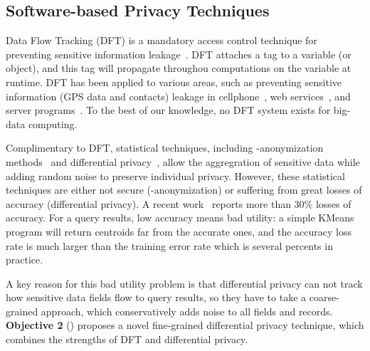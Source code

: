 \vspace{-.15in}\subsection{Software-based Privacy Techniques}
\label{sec:dft}\vspace{-.075in}

Data Flow Tracking (DFT) is a mandatory access control technique for preventing 
sensitive information leakage~\cite{dawn05:taint}. DFT attaches a tag to a 
variable (or object), and this tag will propagate throughou computations on the 
variable at runtime. DFT has been applied to various areas, such as preventing 
sensitive information (\eg GPS data and contacts) leakage in 
cellphone~\cite{taintdroid:osdi10,cleanos:osdi12}, web 
services~\cite{cloudfence:raid13}, and server programs~\cite{libdft:vee12}. To 
the best of our knowledge, no DFT system exists for big-data computing.
 
 


Complimentary to DFT, statistical techniques, including -anonymization 
methods~\cite{kanonymity,icde06:ldiversity} and
differential privacy~\cite{gupt:sigmod12, pinq:sigmod09,airavat:nsdi10}, allow 
the aggregration of sensitive data while adding random noise to preserve 
individual privacy. However, these statistical techniques are either not secure 
(-anonymization) or suffering from great losses of accuracy 
(differential privacy). A recent work~\cite{differentialresult:vldb15} reports 
more than 30\% losses of accuracy. For a query results, low accuracy means 
bad utility: a simple KMeans program will return centroids far from the 
accurate ones, and the accuracy loss rate is much larger than the training error 
rate which is several percents in practice.

A key reason for this bad utility problem is that differential privacy can not 
track how sensitive data fields flow to query results, so they have to take a 
coarse-grained approach, which conservatively adds noise to all fields and 
records. \textbf{Objective 2} () proposes a novel fine-grained 
differential privacy technique, which combines  the strengths of DFT and 
differential privacy.



